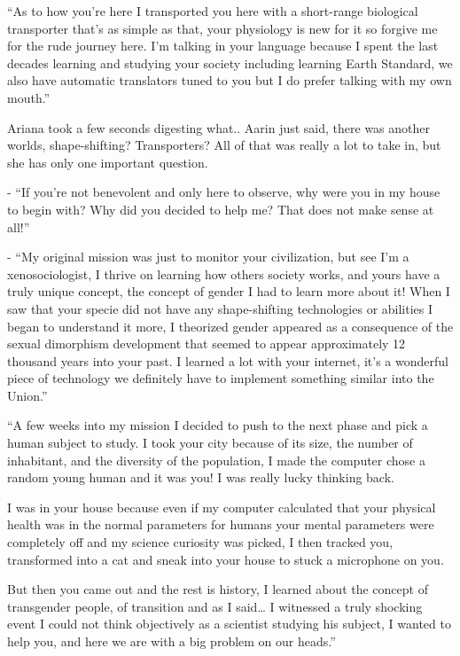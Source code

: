 \documentclass[hidelinks,12pt,a4paper]{book}
\begin{document}
“As to how you're here I transported you here with a short-range biological transporter that's as simple as that, 
your physiology is new for it so forgive me for the rude journey here. I'm talking in your language because I spent the
 last decades learning and studying your society including learning Earth Standard, we also have automatic translators 
 tuned to you but I do prefer talking with my own mouth.”\par
 \bigskip

Ariana took a few seconds digesting what.. Aarin just said, there was another worlds, shape-shifting? Transporters? 
All of that was really a lot to take in, but she has only one important question.\par
\bigskip

- “If you're not benevolent and only here to observe, why were you in my house to begin with? 
Why did you decided to help me? That does not make sense at all!”\par
\bigskip

- “My original mission was just to monitor your civilization, but see I'm a xenosociologist, I thrive on learning 
how others society works, and yours have a truly unique concept, the concept of gender I had to learn more about it! 
When I saw that your specie did not have any shape-shifting technologies or abilities I began to
 understand it more, I theorized gender appeared as a consequence of the sexual dimorphism development 
 that seemed to appear approximately 12 thousand years into your past. I learned a lot with your internet, 
 it's a wonderful piece of technology we definitely have to implement something similar into the Union.”\par
 \bigskip

“A few weeks into my mission I decided to push to the next phase and pick a human subject to study. I took your city 
because of its size, the number of inhabitant, and the diversity of the population, I made the computer chose a 
random young human and it was you! I was really lucky thinking back.\par
\bigskip

I was in your house because even if my computer calculated that your physical health was in the normal parameters 
for humans your mental parameters were completely off and my science curiosity was picked, I then tracked you,
 transformed into a cat and sneak into your house to stuck a microphone on you. \par
 \bigskip

But then you came out and the rest is history, I learned about the concept of transgender people, of 
transition and as I said… I witnessed a truly shocking event I could not think objectively as a scientist 
studying his subject, I wanted to help you, and here we are with a big problem on our heads.”\par
\bigskip
\end{document}
